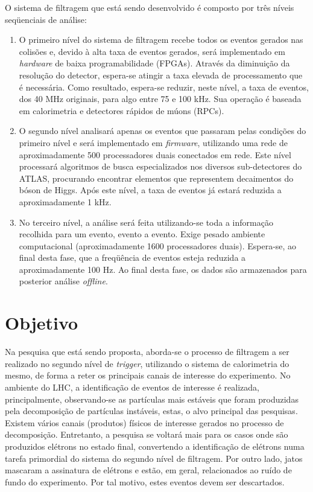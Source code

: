 O sistema de filtragem que está sendo desenvolvido é composto por três níveis seqüenciais de análise:

\begin{enumerate}

\item O primeiro nível do sistema de filtragem recebe todos os eventos gerados nas colisões e, devido à alta taxa de eventos gerados, será implementado em \emph{hardware} de baixa programabilidade (FPGAs). Através da diminuição da resolução do detector, espera-se atingir a taxa elevada de processamento que é necessária. Como resultado, espera-se reduzir, neste nível, a taxa de eventos, dos 40 MHz originais, para algo entre 75 e 100 kHz. Sua operação é baseada em calorimetria e detectores rápidos de múons (RPCs).

\item O segundo nível analisará apenas os eventos que passaram pelas condições do primeiro nível e será implementado em \emph{firmware}, utilizando uma rede de aproximadamente 500 processadores duais conectados em rede. Este nível processará algoritmos de busca especializados nos diversos sub-detectores do ATLAS, procurando encontrar elementos que representem decaimentos do bóson de Higgs. Após este nível, a taxa de eventos já estará reduzida a aproximadamente 1 kHz.

\item No terceiro nível, a análise será feita utilizando-se toda a informação recolhida para um evento, evento a evento. Exige pesado ambiente computacional (aproximadamente 1600 processadores duais). Espera-se, ao final desta fase, que a freqüência de eventos esteja reduzida a aproximadamente 100 Hz. Ao final desta fase, os dados são armazenados para posterior análise \emph{offline}.

\end{enumerate}


\section{Objetivo}

Na pesquisa que está sendo proposta, aborda-se o processo de filtragem a ser realizado no segundo nível de \emph{trigger}, utilizando o sistema de calorimetria do mesmo, de forma a reter os principais canais de interesse do experimento. No ambiente do LHC, a identificação de eventos de interesse é realizada, principalmente, observando-se as partículas mais estáveis que foram produzidas pela decomposição de partículas instáveis, estas, o alvo principal das pesquisas. Existem vários canais (produtos) físicos de interesse gerados no processo de decomposição. Entretanto, a pesquisa se voltará mais para os casos onde são produzidos elétrons no estado final, convertendo a identificação de elétrons numa tarefa primordial do sistema do segundo nível de filtragem. Por outro lado, jatos mascaram a assinatura de elétrons e estão, em geral, relacionados ao ruído de fundo do experimento. Por tal motivo, estes eventos devem ser descartados.


